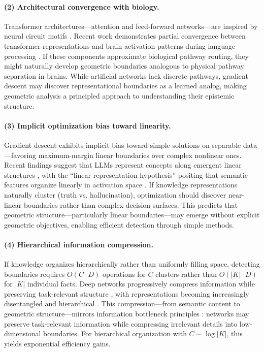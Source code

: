\documentclass[11pt]{article}
\begin{document}
\paragraph{(2) Architectural convergence with biology.} Transformer architectures---attention and feed-forward networks---are inspired by neural circuit motifs \citep{bronstein2021geometric}. Recent work demonstrates partial convergence between transformer representations and brain activation patterns during language processing \citep{caucheteux2022brains, schrimpf2021neural}. If these components approximate biological pathway routing, they might naturally develop geometric boundaries analogous to physical pathway separation in brains. While artificial networks lack discrete pathways, gradient descent may discover representational boundaries as a learned analog, making geometric analysis a principled approach to understanding their epistemic structure.

\paragraph{(3) Implicit optimization bias toward linearity.} Gradient descent exhibits implicit bias toward simple solutions on separable data \citep{soudry2018implicit}---favoring maximum-margin linear boundaries over complex nonlinear ones. Recent findings suggest that LLMs represent concepts along emergent linear structures \citep{marks2023geometry}, with the ``linear representation hypothesis'' positing that semantic features organize linearly in activation space \citep{nanda2023emergent}. If knowledge representations naturally cluster (truth vs. hallucination), optimization should discover near-linear boundaries rather than complex decision surfaces. This predicts that geometric structure---particularly linear boundaries---may emerge without explicit geometric objectives, enabling efficient detection through simple methods.

\paragraph{(4) Hierarchical information compression.} If knowledge organizes hierarchically rather than uniformly filling space, detecting boundaries requires $O(C \cdot D)$ operations for $C$ clusters rather than $O(|K| \cdot D)$ for $|K|$ individual facts. Deep networks progressively compress information while preserving task-relevant structure \citep{saxe2019information}, with representations becoming increasingly disentangled and hierarchical \citep{achille2018emergence}. This compression---from semantic content to geometric structure---mirrors information bottleneck principles \citep{tishby2015deep}: networks may preserve task-relevant information while compressing irrelevant details into low-dimensional boundaries. For hierarchical organization with $C \sim \log |K|$, this yields exponential efficiency gains.
\end{document}
